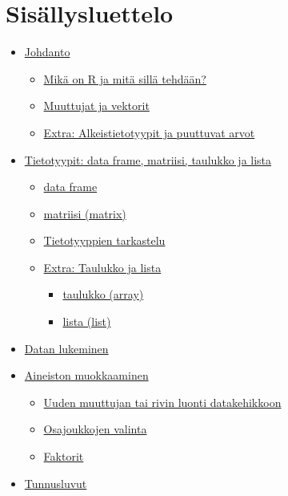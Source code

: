 \documentclass[
]{book}
\providecommand{\tightlist}{%
  \setlength{\itemsep}{0pt}\setlength{\parskip}{0pt}}
\begin{document}
\hypertarget{sisuxe4llysluettelo}{%
\section*{Sisällysluettelo}\label{sisuxe4llysluettelo}}

\begin{itemize}
\tightlist
\item
  \protect\hyperlink{intro}{Johdanto}

  \begin{itemize}
  \tightlist
  \item
    \protect\hyperlink{what_R}{Mikä on R ja mitä sillä tehdään?}
  \item
    \protect\hyperlink{variables_and_vectors}{Muuttujat ja vektorit}
  \item
    \protect\hyperlink{extra}{Extra: Alkeistietotyypit ja puuttuvat arvot}
  \end{itemize}
\item
  \protect\hyperlink{data_types}{Tietotyypit: data frame, matriisi, taulukko ja lista}

  \begin{itemize}
  \tightlist
  \item
    \protect\hyperlink{data-frame}{data frame}
  \item
    \protect\hyperlink{matriisi}{matriisi (matrix)}
  \item
    \href{tietotyyppien-tarkastelu}{Tietotyyppien tarkastelu}
  \item
    \protect\hyperlink{taulukot-ja-listat}{Extra: Taulukko ja lista}

    \begin{itemize}
    \tightlist
    \item
      \protect\hyperlink{taulukko}{taulukko (array)}
    \item
      \protect\hyperlink{lista}{lista (list)}
    \end{itemize}
  \end{itemize}
\item
  \protect\hyperlink{reading_data}{Datan lukeminen}
\item
  \protect\hyperlink{data-wrangling}{Aineiston muokkaaminen}

  \begin{itemize}
  \tightlist
  \item
    \protect\hyperlink{data-frame-wrangling}{Uuden muuttujan tai rivin luonti datakehikkoon}
  \item
    \protect\hyperlink{osajoukkojen-valinta}{Osajoukkojen valinta}
  \item
    \protect\hyperlink{faktorit}{Faktorit}
  \end{itemize}
\item
  \protect\hyperlink{statistics}{Tunnusluvut}


\end{itemize}
\end{document}
